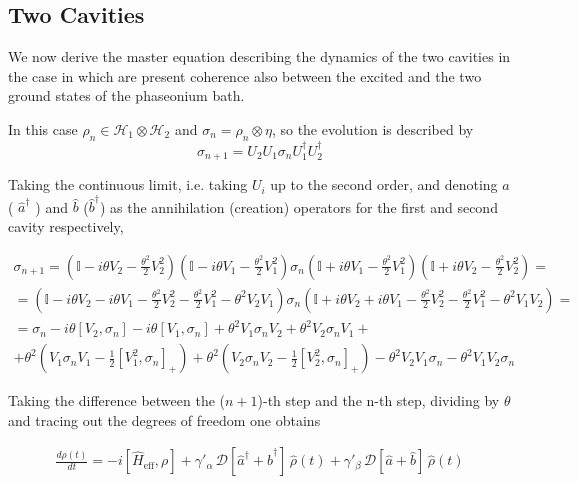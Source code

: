 \documentclass[]{article}
\renewcommand{\a}{\hat{a}}
\newcommand{\ad}{\hat{a}^\dagger}
\renewcommand{\b}{\hat{b}}
\newcommand{\bd}{\hat{b}^\dagger}
\begin{document}
\subsection{Two Cavities}
\renewcommand{\b}{\hat{b}}
We now derive the master equation describing the dynamics of the two cavities in the case in which are present coherence also between the excited and the two ground states of the phaseonium bath. 


In this case $\rho_n \in \mathcal{H}_1\otimes\mathcal{H}_2$ and $\sigma_n=\rho_n\otimes\eta$, so the evolution is described by
\begin{equation}
\sigma_{n+1}=U_2 U_1\sigma_n U^\dagger_1 U^\dagger_2
\end{equation}

Taking the continuous limit, i.e. taking $U_i$ up to the second order, and denoting $\a$ ( $\ad$ ) and $\hat{b}$ ($\bd$) as the annihilation (creation) operators for the first  and second cavity respectively,

\begin{multline}
\sigma_{n+1}=(\mathbb{I}-i\theta V_2-\frac{\theta^2}{2} V^2_2)(\mathbb{I}-i\theta V_1-\frac{\theta^2}{2} V^2_1)\sigma_n(\mathbb{I}+i\theta V_1-\frac{\theta^2}{2} V^2_1)(\mathbb{I}+i\theta V_2-\frac{\theta^2}{2} V^2_2)=\\
=(\mathbb{I}-i\theta V_2-i\theta V_1-\frac{\theta^2}{2} V^2_2-\frac{\theta^2}{2} V^2_1-\theta^2V_2V_1)\sigma_n(\mathbb{I}+i\theta V_2+i\theta V_1-\frac{\theta^2}{2} V^2_2-\frac{\theta^2}{2} V^2_1-\theta^2V_1V_2)=\\
=\sigma_n-i\theta[V_2,\sigma_n]-i\theta[V_1,\sigma_n]+\theta^2V_1\sigma_nV_2+\theta^2V_2\sigma_nV_1+\\+\theta^2(V_1\sigma_nV_1-\frac{1}{2}[V^2_1,\sigma_n]_+)+\theta^2(V_2\sigma_nV_2-\frac{1}{2}[V^2_2,\sigma_n]_+)-\theta^2V_2V_1\sigma_n-\theta^2V_1V_2\sigma_n
\end{multline}

Taking the difference between the ($n+1$)-th step and the n-th step, dividing by $\theta$ and tracing out the degrees of freedom one obtains 

\begin{align}\label{def:lindbladian-evolution-two-cavities}
    \frac{d\rho(t)}{d t}
    = -i[\hat{H}_\text{eff},\rho] +  \gamma'_\alpha \,\mathcal{D}[\hat{a}^\dagger{+}\hat{b}^\dagger]\,\hat{\rho}(t)+\gamma'_\beta \,\mathcal{D}[\hat{a}{+}\hat{b}]\,\hat{\rho}(t)
\end{align}
\end{document}
